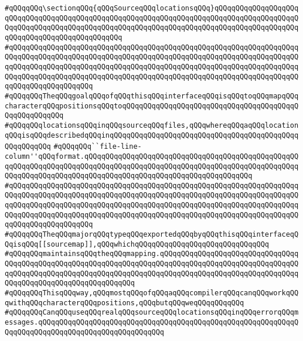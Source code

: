 \label{src/lib/compiler/front/basics/source/line-number-db.api}
\verb|#qQQqqQQq\sectionqQQq{qQQqSourceqQQqlocationsqQQq}qQQqqQQqqQQqqQQqqQQqqQQqqQQqqQQqqQQqqQQqqQQqqQQqqQQqqQQqqQQqqQQqqQQqqQQqqQQqqQQqqQQqqQQqqQQqqQQqqQQqqQQqqQQqqQQqqQQqqQQqqQQqqQQqqQQqqQQqqQQqqQQqqQQqqQQqqQQqqQQqqQQqqQQqqQQqqQQqqQQqqQQqqQQq|\newline
\verb|#qQQqqQQqqQQqqQQqqQQqqQQqqQQqqQQqqQQqqQQqqQQqqQQqqQQqqQQqqQQqqQQqqQQqqQQqqQQqqQQqqQQqqQQqqQQqqQQqqQQqqQQqqQQqqQQqqQQqqQQqqQQqqQQqqQQqqQQqqQQqqQQqqQQqqQQqqQQqqQQqqQQqqQQqqQQqqQQqqQQqqQQqqQQqqQQqqQQqqQQqqQQqqQQqqQQqqQQqqQQqqQQqqQQqqQQqqQQqqQQqqQQqqQQqqQQqqQQqqQQqqQQqqQQqqQQqqQQqqQQqqQQqqQQqqQQqqQQqqQQq|\newline
\verb|#qQQqqQQqTheqQQqgoalqQQqofqQQqthisqQQqinterfaceqQQqisqQQqtoqQQqmapqQQqcharacterqQQqpositionsqQQqtoqQQqqQQqqQQqqQQqqQQqqQQqqQQqqQQqqQQqqQQqqQQqqQQqqQQqqQQq|\newline
\verb|#qQQqqQQqlocationsqQQqinqQQqsourceqQQqfiles,qQQqwhereqQQqaqQQqlocationqQQqisqQQqdescribedqQQqinqQQqqQQqqQQqqQQqqQQqqQQqqQQqqQQqqQQqqQQqqQQqqQQqqQQqqQQq|\newline
\verb|#qQQqqQQq``file-line-column''qQQqformat.qQQqqQQqqQQqqQQqqQQqqQQqqQQqqQQqqQQqqQQqqQQqqQQqqQQqqQQqqQQqqQQqqQQqqQQqqQQqqQQqqQQqqQQqqQQqqQQqqQQqqQQqqQQqqQQqqQQqqQQqqQQqqQQqqQQqqQQqqQQqqQQqqQQqqQQqqQQqqQQqqQQqqQQqqQQqqQQqqQQq|\newline
\verb|#qQQqqQQqqQQqqQQqqQQqqQQqqQQqqQQqqQQqqQQqqQQqqQQqqQQqqQQqqQQqqQQqqQQqqQQqqQQqqQQqqQQqqQQqqQQqqQQqqQQqqQQqqQQqqQQqqQQqqQQqqQQqqQQqqQQqqQQqqQQqqQQqqQQqqQQqqQQqqQQqqQQqqQQqqQQqqQQqqQQqqQQqqQQqqQQqqQQqqQQqqQQqqQQqqQQqqQQqqQQqqQQqqQQqqQQqqQQqqQQqqQQqqQQqqQQqqQQqqQQqqQQqqQQqqQQqqQQqqQQqqQQqqQQqqQQqqQQqqQQq|\newline
\verb|#qQQqqQQqTheqQQqmajorqQQqtypeqQQqexportedqQQqbyqQQqthisqQQqinterfaceqQQqisqQQq[[sourcemap]],qQQqwhichqQQqqQQqqQQqqQQqqQQqqQQqqQQqqQQq|\newline
\verb|#qQQqqQQqmaintainsqQQqtheqQQqmapping.qQQqqQQqqQQqqQQqqQQqqQQqqQQqqQQqqQQqqQQqqQQqqQQqqQQqqQQqqQQqqQQqqQQqqQQqqQQqqQQqqQQqqQQqqQQqqQQqqQQqqQQqqQQqqQQqqQQqqQQqqQQqqQQqqQQqqQQqqQQqqQQqqQQqqQQqqQQqqQQqqQQqqQQqqQQqqQQqqQQqqQQqqQQqqQQqqQQqqQQqqQQq|\newline
\verb|#qQQqqQQqThisqQQqway,qQQqmostqQQqofqQQqaqQQqcompilerqQQqcanqQQqworkqQQqwithqQQqcharacterqQQqpositions,qQQqbutqQQqweqQQqqQQqqQQq|\newline
\verb|#qQQqqQQqCanqQQquseqQQqrealqQQqsourceqQQqlocationsqQQqinqQQqerrorqQQqmessages.qQQqqQQqqQQqqQQqqQQqqQQqqQQqqQQqqQQqqQQqqQQqqQQqqQQqqQQqqQQqqQQqqQQqqQQqqQQqqQQqqQQqqQQqqQQqqQQqqQQq|\newline
